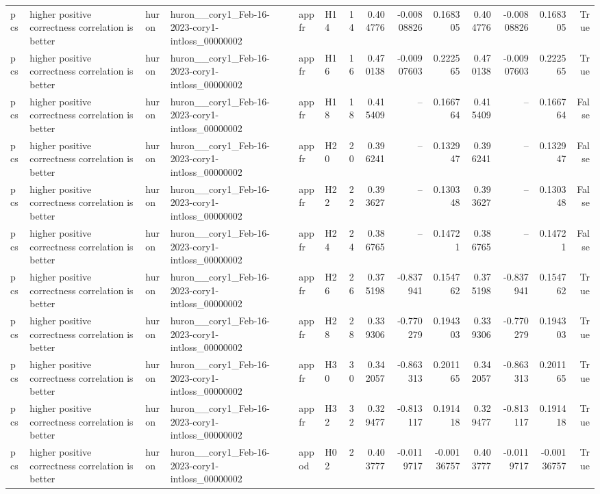\begin{longtable}{llllllrrrrrrrr}
pcs & higher positive correctness correlation is better & huron & huron\_\_cory1\_Feb-16-2023-cory1-intloss\_00000002 & appfr & H14 & 14 & 0.404776 & -0.00808826 & 0.168305 & 0.404776 & -0.00808826 & 0.168305 & True \\
pcs & higher positive correctness correlation is better & huron & huron\_\_cory1\_Feb-16-2023-cory1-intloss\_00000002 & appfr & H16 & 16 & 0.470138 & -0.00907603 & 0.222565 & 0.470138 & -0.00907603 & 0.222565 & True \\
pcs & higher positive correctness correlation is better & huron & huron\_\_cory1\_Feb-16-2023-cory1-intloss\_00000002 & appfr & H18 & 18 & 0.415409 & -- & 0.166764 & 0.415409 & -- & 0.166764 & False \\
pcs & higher positive correctness correlation is better & huron & huron\_\_cory1\_Feb-16-2023-cory1-intloss\_00000002 & appfr & H20 & 20 & 0.396241 & -- & 0.132947 & 0.396241 & -- & 0.132947 & False \\
pcs & higher positive correctness correlation is better & huron & huron\_\_cory1\_Feb-16-2023-cory1-intloss\_00000002 & appfr & H22 & 22 & 0.393627 & -- & 0.130348 & 0.393627 & -- & 0.130348 & False \\
pcs & higher positive correctness correlation is better & huron & huron\_\_cory1\_Feb-16-2023-cory1-intloss\_00000002 & appfr & H24 & 24 & 0.386765 & -- & 0.14721 & 0.386765 & -- & 0.14721 & False \\
pcs & higher positive correctness correlation is better & huron & huron\_\_cory1\_Feb-16-2023-cory1-intloss\_00000002 & appfr & H26 & 26 & 0.375198 & -0.837941 & 0.154762 & 0.375198 & -0.837941 & 0.154762 & True \\
pcs & higher positive correctness correlation is better & huron & huron\_\_cory1\_Feb-16-2023-cory1-intloss\_00000002 & appfr & H28 & 28 & 0.339306 & -0.770279 & 0.194303 & 0.339306 & -0.770279 & 0.194303 & True \\
pcs & higher positive correctness correlation is better & huron & huron\_\_cory1\_Feb-16-2023-cory1-intloss\_00000002 & appfr & H30 & 30 & 0.342057 & -0.863313 & 0.201165 & 0.342057 & -0.863313 & 0.201165 & True \\
pcs & higher positive correctness correlation is better & huron & huron\_\_cory1\_Feb-16-2023-cory1-intloss\_00000002 & appfr & H32 & 32 & 0.329477 & -0.813117 & 0.191418 & 0.329477 & -0.813117 & 0.191418 & True \\
pcs & higher positive correctness correlation is better & huron & huron\_\_cory1\_Feb-16-2023-cory1-intloss\_00000002 & appod & H02 & 2 & 0.403777 & -0.0119717 & -0.00136757 & 0.403777 & -0.0119717 & -0.00136757 & True \\

\end{longtable}
